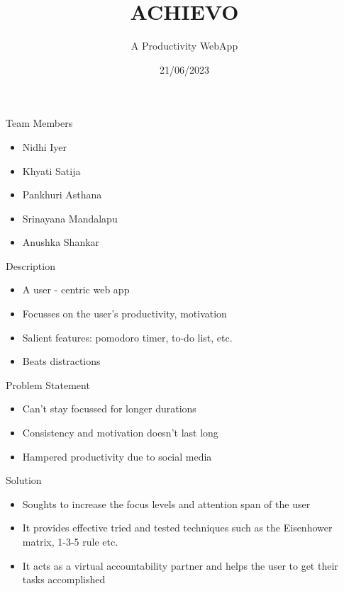 \documentclass{beamer}
\title{ACHIEVO}
\subtitle{A Productivity WebApp}
\institute[Program]{
	\inst{Women Engineers}
	\inst{TalentSprint}
}
\date{21/06/2023}
\begin{document}
	
	\maketitle
	\begin{frame}{Team Members}
		\begin{itemize}
		\item Nidhi Iyer
		\item Khyati Satija
		\item Pankhuri Asthana
		\item Srinayana Mandalapu
		\item Anushka Shankar
		\end{itemize}
	\end{frame}

	\begin{frame}{Description}
		\begin{itemize}
		\item A user - centric web app 
		\item Focusses on the user's productivity, motivation 
		\item Salient features: pomodoro timer, to-do list, etc.
		\item Beats distractions
		\end{itemize}
	\end{frame}

	\begin{frame}{Problem Statement}
		\justifying
		\begin{itemize}
		\item Can't stay focussed for longer durations
		\item Consistency and motivation doesn't last long
		\item Hampered productivity due to social media
		\end{itemize}
	\end{frame}

	\begin{frame}{Solution}
		\justifying
		\begin{itemize}
		\item Soughts to increase the focus levels and attention span of the user
		\item It provides effective tried and tested techniques such as the Eisenhower matrix, 1-3-5 rule etc. 
		\item It acts as a virtual accountability partner and helps the user to get their tasks accomplished
		\end{itemize}
	\end{frame}
	
\end{document}
